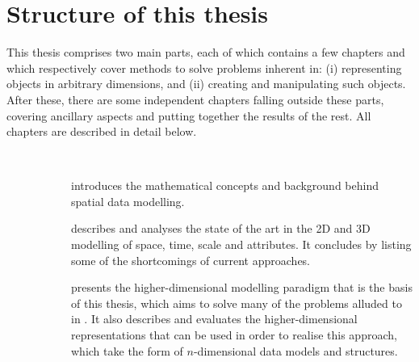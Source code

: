 \section{Structure of this thesis}
\label{se:about}

This thesis comprises two main parts, each of which contains a few chapters and which respectively cover methods to solve problems inherent in: (i) representing objects in arbitrary dimensions, and (ii) creating and manipulating such objects.
After these, there are some independent chapters falling outside these parts, covering ancillary aspects and putting together the results of the rest.
All chapters are described in detail below.


\begin{description}

\item[ ] \ 

\begin{description}

\item[]
introduces the mathematical concepts and background behind spatial data modelling.

\item[]
describes and analyses the state of the art in the 2D and 3D modelling of space, time, scale and attributes.
It concludes by listing some of the shortcomings of current approaches.

\item[]
presents the higher-dimensional modelling paradigm that is the basis of this thesis, which aims to solve many of the problems alluded to in .
It also describes and evaluates the higher-dimensional representations that can be used in order to realise this approach, which take the form of $n$-dimensional data models and structures.

\end{description}

\item[ ] \ 

\begin{description}


\end{description}
\end{description}
